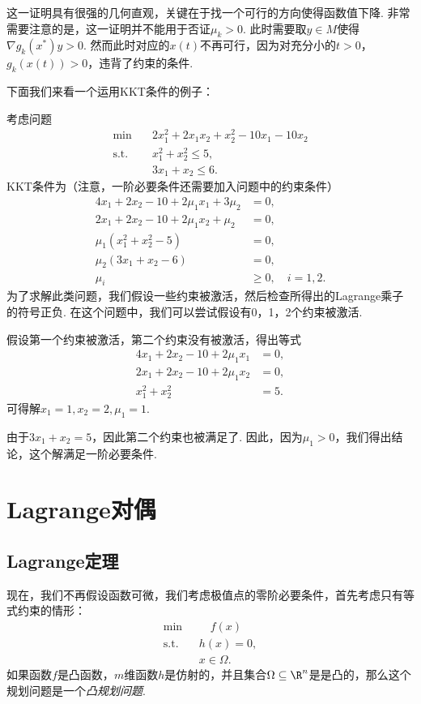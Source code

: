 \begin{remark}
这一证明具有很强的几何直观，关键在于找一个可行的方向使得函数值下降. 非常需要注意的是，这一证明并不能用于否证$\mu_k>0$. 此时需要取${y}\in M$使得$\nabla g_k(x^*)y>0$. 然而此时对应的$x(t)$不再可行，因为对充分小的$t>0$，$g_k(x(t))>0$，违背了约束的条件.
\end{remark}

下面我们来看一个运用KKT条件的例子：
\begin{example}
考虑问题
\begin{align*}
    \min \quad &2x_1^2+2x_1x_2+x_2^2-10x_1-10x_2 \\
    \text{s.t.}\quad &x_1^2+x_2^2\leq 5, \\
    & 3x_1+x_2\leq 6.
\end{align*}
KKT条件为（注意，一阶必要条件还需要加入问题中的约束条件）
\begin{align*}
    4x_1+2x_2-10+2\mu_1x_1+3\mu_2&=0, \\
    2x_1+2x_2-10+2\mu_1x_2+\mu_2&=0, \\
    \mu_1(x_1^2+x_2^2-5)&=0, \\
    \mu_2(3x_1+x_2-6)&=0,\\
    \mu_i&\ge 0,\quad i=1,2.
\end{align*}
为了求解此类问题，我们假设一些约束被激活，然后检查所得出的Lagrange乘子的符号正负. 在这个问题中，我们可以尝试假设有0，1，2个约束被激活. 

假设第一个约束被激活，第二个约束没有被激活，得出等式
\begin{align*}
4x_1+2x_2-10+2\mu_1x_1&=0, \\
2x_1+2x_2-10+2\mu_1x_2&=0, \\
x_1^2+x_2^2&=5.
\end{align*}
可得解$x_1=1,x_2=2,\mu_1=1.$

由于$3x_1+x_2=5$，因此第二个约束也被满足了. 因此，因为$\mu_1 > 0$，我们得出结论，这个解满足一阶必要条件. 
\end{example}

\section{Lagrange对偶}
\subsection{Lagrange定理}
现在，我们不再假设函数可微，我们考虑极值点的零阶必要条件，首先考虑只有等式约束的情形：
    \begin{equation}
          \begin{aligned}
        \min&\quad f(x) \\
        \text{s.t.}\quad& {h(x)=0}, \\
        &x\in\Omega.
        \end{aligned}\label{eq:eq-zero-cond}
    \end{equation}
如果函数$f$是凸函数，$m$维函数${h}$是仿射的，并且集合$\Omega\subseteq \R^n$是是凸的，那么这个规划问题是一个\emph{凸规划问题}. 

